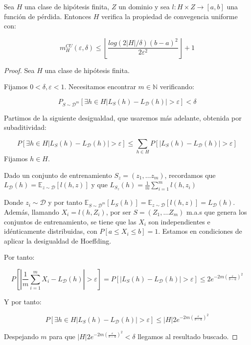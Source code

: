   
\begin{fact}
Sea $H$ una clase de hipótesis finita, $Z$ un dominio y sea $l : H \times Z \rightarrow [a,b]$ una función de pérdida. Entonces $H$ verifica la propiedad de convegencia uniforme con: 

\[m_{H}^{CU}(\varepsilon, \delta) \le \left\lfloor \frac{log(2|H|/\delta)(b-a)^2}{2\varepsilon^2} \right\rfloor + 1\]
\end{fact}
  \begin{proof}
  Sea $H$ una clase de hipótesis finita.

  Fijamos $0 < \delta, \varepsilon < 1$. Necesitamos encontrar $m\in \mathbb{N}$ verificando:

  \[P_{S\sim \mathcal{D}^m} [\exists h\in H |L_S(h) - L_{\mathcal{D}}(h)| > \varepsilon] < \delta\]

  Partimos de la siguiente desigualdad, que usaremos más adelante, obtenida por subaditividad:

  \[P [\exists h\in H |L_S(h) - L_{\mathcal{D}}(h)| > \varepsilon] \le \sum_{h \in H} P [|L_S(h) - L_{\mathcal{D}}(h)| > \varepsilon]\]
  Fijamos $h \in H$.

  Dado un conjunto de entrenamiento $S_z = (z_1, \ldots z_m)$, recordamos que $L_{\mathcal{D}} (h) = \mathbb{E}_{z\sim \mathcal{D}} [l(h,z)]$ y que $L_{S_z}(h) = \frac{1}{m} \sum_{i=1}^m l(h,z_i)$

  Donde $z_i \sim \mathcal{D}$ y por tanto $\mathbb{E}_{S \sim \mathcal{D}^m} [L_S(h)] = \mathbb{E}_{z \sim \mathcal{D}} [l(h,z)] = L_{\mathcal{D}} (h)$. Además, llamando $X_i = l(h,Z_i)$, por ser $S=(Z_1, \ldots Z_m)$ m.a.s que genera los conjuntos de entrenamiento, se tiene que las $X_i$ son independientes e idénticamente distribuidas, con $P[a \le X_i \le b] = 1$. Estamos en condiciones de aplicar la desigualdad de Hoeffding.

  Por tanto:

  \[P \left[\left| \frac{1}{m} \sum_{i=1}^m X_i - L_{\mathcal{D}} (h) \right| > \varepsilon\right] = P [|L_S(h) - L_{\mathcal{D}}(h)| > \varepsilon] \le 2e^{-2m \left( \frac{\varepsilon}{b-a} \right)^2}\]

  Y por tanto:

  \[P [\exists h\in H |L_S(h) - L_{\mathcal{D}}(h)| > \varepsilon] \le |H| 2e^{-2m \left( \frac{\varepsilon}{b-a} \right)^2}\]

  Despejando $m$ para que $|H| 2e^{-2m \left( \frac{\varepsilon}{b-a} \right)^2} < \delta$ llegamos al resultado buscado.
  \end{proof}

